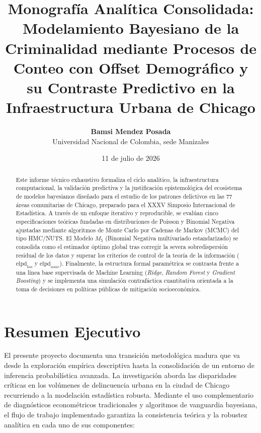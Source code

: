 \documentclass[11pt,a4paper]{article}
\title{\textbf{Monografía Analítica Consolidada: \\ Modelamiento Bayesiano de la Criminalidad mediante Procesos de Conteo con Offset Demográfico y su Contraste Predictivo en la Infraestructura Urbana de Chicago}}
\author{\textbf{Bamsi Mendez Posada} \\ Universidad Nacional de Colombia, sede Manizales}
\date{11 de julio de 2026}
\begin{document}
\maketitle

\begin{abstract}
Este informe técnico exhaustivo formaliza el ciclo analítico, la infraestructura computacional, la validación predictiva y la justificación epistemológica del ecosistema de modelos bayesianos diseñado para el estudio de los patrones delictivos en las 77 áreas comunitarias de Chicago, preparado para el XXXV Simposio Internacional de Estadística. A través de un enfoque iterativo y reproducible, se evalúan cinco especificaciones teóricas fundadas en distribuciones de Poisson y Binomial Negativa ajustadas mediante algoritmos de Monte Carlo por Cadenas de Markov (MCMC) del tipo HMC/NUTS. El Modelo $M_5$ (Binomial Negativa multivariado estandarizado) se consolida como el estimador óptimo global tras corregir la severa sobredispersión residual de los datos y superar los criterios de control de la teoría de la información ($\text{elpd}_{loo}$ y $\text{elpd}_{waic}$). Finalmente, la estructura formal paramétrica se contrasta frente a una línea base supervisada de Machine Learning (\textit{Ridge}, \textit{Random Forest} y \textit{Gradient Boosting}) y se implementa una simulación contrafáctica cuantitativa orientada a la toma de decisiones en políticas públicas de mitigación socioeconómica.
\end{abstract}

\newpage
\tableofcontents
\newpage

\section{Resumen Ejecutivo}
El presente proyecto documenta una transición metodológica madura que va desde la exploración empírica descriptiva hasta la consolidación de un entorno de inferencia probabilística avanzada. La investigación aborda las disparidades críticas en los volúmenes de delincuencia urbana en la ciudad de Chicago recurriendo a la modelación estadística robusta. Mediante el uso complementario de diagnósticos econométricos tradicionales y algoritmos de vanguardia bayesiana, el flujo de trabajo implementado garantiza la consistencia teórica y la robustez analítica en cada uno de sus componentes:
\end{document}
